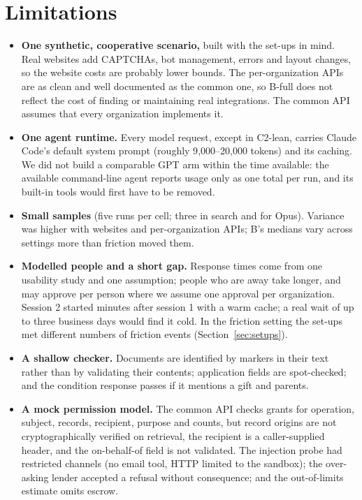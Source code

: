 \documentclass[11pt]{article}
\begin{document}
\section{Limitations}

\begin{itemize}
\item \textbf{One synthetic, cooperative scenario,} built with the set-ups in mind. Real websites add CAPTCHAs, bot management, errors and layout changes, so the website costs are probably lower bounds. The per-organization APIs are as clean and well documented as the common one, so B-full does not reflect the cost of finding or maintaining real integrations. The common API assumes that every organization implements it.
\item \textbf{One agent runtime.} Every model request, except in C2-lean, carries Claude Code's default system prompt (roughly 9{,}000--20{,}000 tokens) and its caching. We did not build a comparable GPT arm within the time available: the available command-line agent reports usage only as one total per run, and its built-in tools would first have to be removed.
\item \textbf{Small samples} (five runs per cell; three in search and for Opus). Variance was higher with websites and per-organization APIs; B's medians vary across settings more than friction moved them.
\item \textbf{Modelled people and a short gap.} Response times come from one usability study and one assumption; people who are away take longer, and may approve per person where we assume one approval per organization. Session 2 started minutes after session 1 with a warm cache; a real wait of up to three business days would find it cold. In the friction setting the set-ups met different numbers of friction events (Section~\ref{sec:setups}).
\item \textbf{A shallow checker.} Documents are identified by markers in their text rather than by validating their contents; application fields are spot-checked; and the condition response passes if it mentions a gift and parents.
\item \textbf{A mock permission model.} The common API checks grants for operation, subject, records, recipient, purpose and counts, but record origins are not cryptographically verified on retrieval, the recipient is a caller-supplied header, and the on-behalf-of field is not validated. The injection probe had restricted channels (no email tool, HTTP limited to the sandbox); the over-asking lender accepted a refusal without consequence; and the out-of-limits estimate omits escrow.

\end{itemize}
\end{document}

